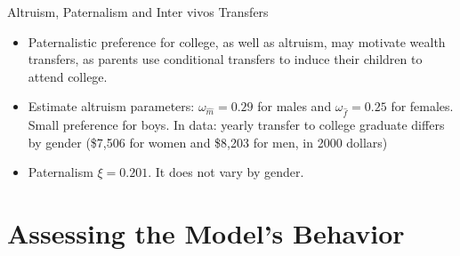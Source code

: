 \documentclass{beamer}
\begin{document}
\begin{frame}[label=Altruism]{Altruism, Paternalism and Inter vivos Transfers}
\begin{itemize}
\item Paternalistic preference for college, as well as altruism, may motivate wealth transfers, as parents use conditional transfers to induce their children to attend college.
\item Estimate altruism parameters: $\omega_{\hat{m}}=0.29$ for males and $\omega_{\hat{f}}=0.25$ for females. Small preference for boys. In data: yearly transfer to college graduate differs by gender (\$7,506 for women and \$8,203 for men, in 2000 dollars)
\item Paternalism $\xi=0.201$. It does not vary by gender.

\end{itemize}

\end{frame}


\section{Assessing the Model’s Behavior}
\end{document}
